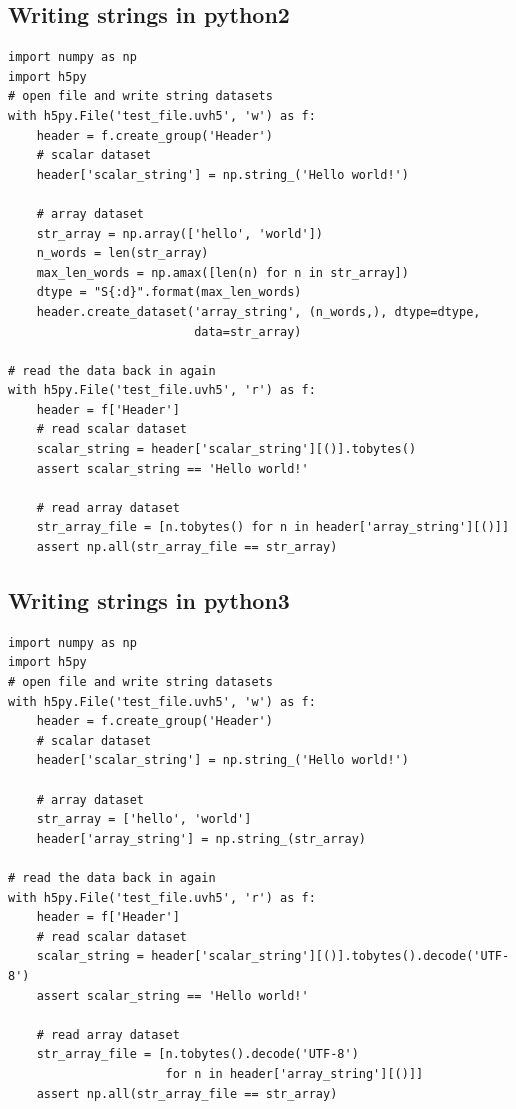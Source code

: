 \documentclass[11pt, oneside]{article}
\begin{document}
\begin{appendices}
\subsection{Writing strings in python2}
\begin{verbatim}
import numpy as np
import h5py
# open file and write string datasets
with h5py.File('test_file.uvh5', 'w') as f:
    header = f.create_group('Header')
    # scalar dataset
    header['scalar_string'] = np.string_('Hello world!')

    # array dataset
    str_array = np.array(['hello', 'world'])
    n_words = len(str_array)
    max_len_words = np.amax([len(n) for n in str_array])
    dtype = "S{:d}".format(max_len_words)
    header.create_dataset('array_string', (n_words,), dtype=dtype,
                          data=str_array)

# read the data back in again
with h5py.File('test_file.uvh5', 'r') as f:
    header = f['Header']
    # read scalar dataset
    scalar_string = header['scalar_string'][()].tobytes()
    assert scalar_string == 'Hello world!'

    # read array dataset
    str_array_file = [n.tobytes() for n in header['array_string'][()]]
    assert np.all(str_array_file == str_array)
\end{verbatim}

\subsection{Writing strings in python3}
\begin{verbatim}
import numpy as np
import h5py
# open file and write string datasets
with h5py.File('test_file.uvh5', 'w') as f:
    header = f.create_group('Header')
    # scalar dataset
    header['scalar_string'] = np.string_('Hello world!')

    # array dataset
    str_array = ['hello', 'world']
    header['array_string'] = np.string_(str_array)

# read the data back in again
with h5py.File('test_file.uvh5', 'r') as f:
    header = f['Header']
    # read scalar dataset
    scalar_string = header['scalar_string'][()].tobytes().decode('UTF-8')
    assert scalar_string == 'Hello world!'

    # read array dataset
    str_array_file = [n.tobytes().decode('UTF-8')
                      for n in header['array_string'][()]]
    assert np.all(str_array_file == str_array)
\end{verbatim}



\end{appendices}
\end{document}
